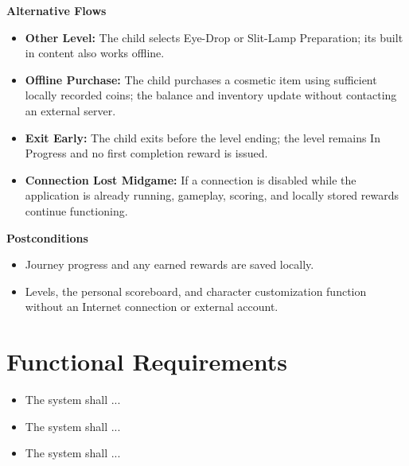 \documentclass[12pt]{article}
\newcounter{reqnum} %
\begin{document}
\textbf{Alternative Flows}
\begin{itemize}
    \item \textbf{Other Level:} The child selects Eye-Drop or
    Slit-Lamp Preparation; its built in content also works offline.
    \item \textbf{Offline Purchase:} The child purchases a cosmetic
    item using sufficient locally recorded coins; the balance and
    inventory update without contacting an external server.
    \item \textbf{Exit Early:} The child exits before the level ending;
    the level remains In Progress and no first completion reward
    is issued.
    \item \textbf{Connection Lost Midgame:} If a connection is
    disabled while the application is already running, gameplay,
    scoring, and locally stored rewards continue functioning.
\end{itemize}

\textbf{Postconditions}
\begin{itemize}
    \item Journey progress and any earned rewards are saved locally.
    \item Levels, the personal scoreboard, and character customization
    function without an Internet connection or external account.
\end{itemize}

\section{Functional Requirements}


\noindent \begin{itemize}

\item[FR\refstepcounter{reqnum}\thereqnum \label{FR_Label1}:] The system shall ...

\item[FR\refstepcounter{reqnum}\thereqnum \label{FR_Label2}:] The system shall ...

\item[FR\refstepcounter{reqnum}\thereqnum \label{FR_Label3}:] The system shall ...

\end{itemize}
\end{document}
